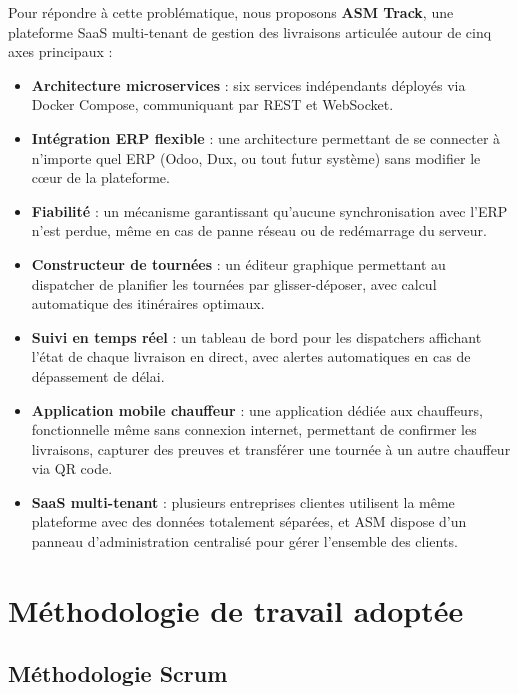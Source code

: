 Pour répondre à cette problématique, nous proposons \textbf{ASM Track}, une plateforme SaaS
multi-tenant de gestion des livraisons articulée autour de cinq axes principaux :

\begin{itemize}
  \item \textbf{Architecture microservices} : six services indépendants déployés via Docker
        Compose, communiquant par REST et WebSocket.
  \item \textbf{Intégration ERP flexible} : une architecture permettant de se connecter
        à n'importe quel ERP (Odoo, Dux, ou tout futur système) sans modifier le cœur
        de la plateforme.
  \item \textbf{Fiabilité} : un mécanisme garantissant qu'aucune synchronisation avec
        l'ERP n'est perdue, même en cas de panne réseau ou de redémarrage du serveur.
  \item \textbf{Constructeur de tournées} : un éditeur graphique permettant au dispatcher
        de planifier les tournées par glisser-déposer, avec calcul automatique des
        itinéraires optimaux.
  \item \textbf{Suivi en temps réel} : un tableau de bord pour les dispatchers affichant
        l'état de chaque livraison en direct, avec alertes automatiques en cas de
        dépassement de délai.
  \item \textbf{Application mobile chauffeur} : une application dédiée aux chauffeurs,
        fonctionnelle même sans connexion internet, permettant de confirmer les livraisons,
        capturer des preuves et transférer une tournée à un autre chauffeur via QR code.
  \item \textbf{SaaS multi-tenant} : plusieurs entreprises clientes utilisent la même
        plateforme avec des données totalement séparées, et ASM dispose d'un panneau
        d'administration centralisé pour gérer l'ensemble des clients.
\end{itemize}

\section{Méthodologie de travail adoptée}

\subsection{Méthodologie Scrum}


